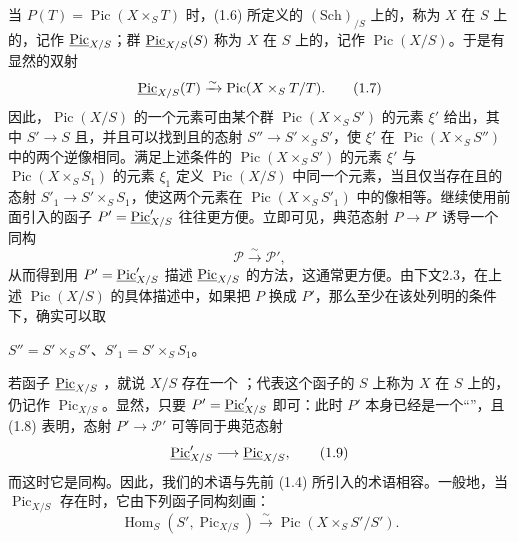 当 $P(T)=\operatorname{Pic}(X\times_S T)$ 时，(1.6) 所定义的 $(\mathrm{Sch})_{/S}$ 上的，称为 $X$ 在 $S$ 上的，记作 $\underline{\operatorname{Pic}}_{X/S}$；群 $\underline{\operatorname{Pic}}_{X/S}(S)$ 称为 $X$ 在 $S$ 上的，记作 $\operatorname{Pic}(X/S)$。于是有显然的双射
\begin{equation}\underline{\operatorname{Pic}}_{X/S}(T)\xrightarrow{\sim}\operatorname{Pic}(X\times_S T/T).\tag{1.7}\end{equation}
因此，$\operatorname{Pic}(X/S)$ 的一个元素可由某个群 $\operatorname{Pic}(X\times_S S')$ 的元素 $\xi'$ 给出，其中 $S'\to S$ 且，并且可以找到且的态射 $S''\to S'\times_S S'$，使 $\xi'$ 在 $\operatorname{Pic}(X\times_S S'')$ 中的两个逆像相同。满足上述条件的 $\operatorname{Pic}(X\times_S S')$ 的元素 $\xi'$ 与 $\operatorname{Pic}(X\times_S S_1)$ 的元素 $\xi_1$ 定义 $\operatorname{Pic}(X/S)$ 中同一个元素，当且仅当存在且的态射 $S'_1\to S'\times_S S_1$，使这两个元素在 $\operatorname{Pic}(X\times_S S'_1)$ 中的像相等。继续使用前面引入的函子 $P'=\underline{\operatorname{Pic}}'_{X/S}$ 往往更方便。立即可见，典范态射 $P\to P'$ 诱导一个同构
\begin{equation}\mathcal P\xrightarrow{\sim}\mathcal P',\tag{1.8}\end{equation}
从而得到用 $P'=\underline{\operatorname{Pic}}'_{X/S}$ 描述 $\underline{\operatorname{Pic}}_{X/S}$ 的方法，这通常更方便。由下文2.3，在上述 $\operatorname{Pic}(X/S)$ 的具体描述中，如果把 $P$ 换成 $P'$，那么至少在该处列明的条件下，确实可以取

$S''=S'\times_S S'$、$S'_1=S'\times_S S_1$。

若函子 $\underline{\operatorname{Pic}}_{X/S}$ ，就说 $X/S$ 存在一个 ；代表这个函子的 $S$ 上称为 $X$ 在 $S$ 上的，仍记作 $\operatorname{Pic}_{X/S}$。显然，只要 $P'=\underline{\operatorname{Pic}}'_{X/S}$ 即可：此时 $P'$ 本身已经是一个“”，且 (1.8) 表明，态射 $P'\to\mathcal P'$ 可等同于典范态射
\begin{equation}\underline{\operatorname{Pic}}'_{X/S}\longrightarrow\underline{\operatorname{Pic}}_{X/S},\tag{1.9}\end{equation}
而这时它是同构。因此，我们的术语与先前 (1.4) 所引入的术语相容。一般地，当 $\operatorname{Pic}_{X/S}$ 存在时，它由下列函子同构刻画：
\begin{equation}\operatorname{Hom}_S(S',\operatorname{Pic}_{X/S})\xrightarrow{\sim}\operatorname{Pic}(X\times_S S'/S').\tag{1.10}\end{equation}

